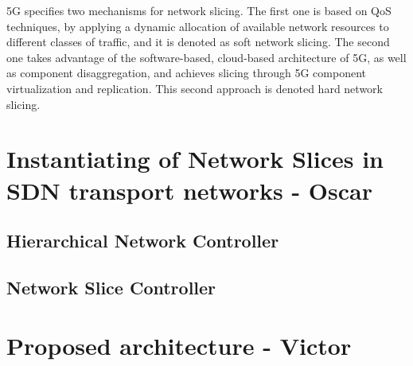 \documentclass[journal,article,submit,moreauthors,pdftex]{Definitions/mdpi}
\begin{document}
5G specifies two mechanisms for network slicing. The first one is based on QoS techniques, by applying a dynamic allocation of available network resources to different classes of traffic, and it is denoted as soft network slicing. The second one takes advantage of the software-based, cloud-based architecture of 5G, as well as component disaggregation, and achieves slicing through 5G component virtualization and replication. This second approach is denoted hard network slicing.


\section{Instantiating of Network Slices in SDN transport networks - Oscar}


\subsection{Hierarchical Network Controller} 

\subsection{Network Slice Controller} 
 
\section{Proposed architecture - Victor}


\end{document}
